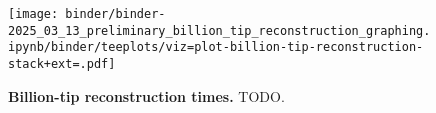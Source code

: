 \begin{figure}

\texttt{[image: binder/binder-2025\_03\_13\_preliminary\_billion\_tip\_reconstruction\_graphing.ipynb/binder/teeplots/viz=plot-billion-tip-reconstruction-stack+ext=.pdf]}

\caption{\textbf{Billion-tip reconstruction times.} TODO.}
\label{fig:billion-tip-time}
\end{figure}
